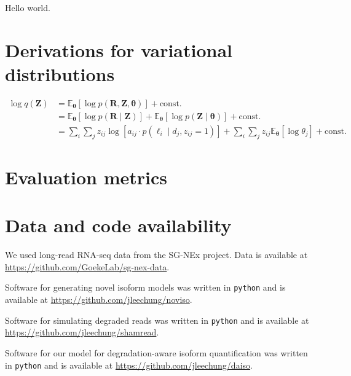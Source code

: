 Hello world.

\chapter{Derivations for variational distributions}\label{sec:variational-dist}

\begin{equation}
\begin{split}
    \log q(\bm{Z}) & = \mathbb{E}_{\bm\theta}\left[\log p(\bm{R},\bm{Z},\bm{\theta})\right] + \textrm{const.} \\
    & = \mathbb{E}_{\bm\theta}\left[\log p(\bm{R}\mid\bm{Z})\right] + \mathbb{E}_{\bm\theta}\left[\log p(\bm{Z}\mid\bm{\theta})\right] + \textrm{const.} \\
    & = \sum_i\sum_j z_{ij}\log\left[a_{ij}\cdot p(\ell_i\mid d_j,z_{ij}=1)\right] + \sum_i\sum_j z_{ij}\mathbb{E}_{\bm\theta}\left[\log\theta_j\right] + \textrm{const.}
\end{split}
\end{equation}

\chapter{Evaluation metrics}

\lipsum[32]

\chapter{Data and code availability}

We used long-read RNA-seq data from the SG-NEx project. Data is available at \url{https://github.com/GoekeLab/sg-nex-data}. 

Software for generating novel isoform models was written in \texttt{python} and is available at \url{https://github.com/jleechung/noviso}.

Software for simulating degraded reads was written in \texttt{python} and is available at \url{https://github.com/jleechung/shamread}. 

Software for our model for degradation-aware isoform quantification was written in \texttt{python} and is available at \url{https://github.com/jleechung/daiso}. 
